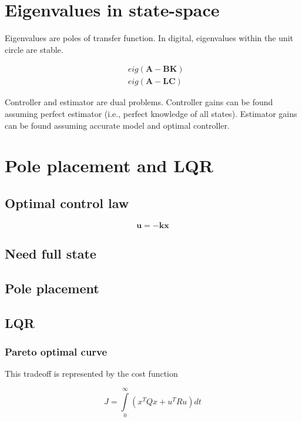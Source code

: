 \documentclass[10pt,conference,compsoc]{IEEEtran}
\newcommand{\mtx}[1] {\bm #1}
\begin{document}
\section{Eigenvalues in state-space}

\noindent Eigenvalues are poles of transfer function. In digital, eigenvalues
within the unit circle are stable.

\begin{align}
  &eig(\mtx{A} - \mtx{B}\mtx{K}) \\
  &eig(\mtx{A} - \mtx{L}\mtx{C})
\end{align}

\noindent Controller and estimator are dual problems. Controller gains can be
found assuming perfect estimator (i.e., perfect knowledge of all states).
Estimator gains can be found assuming accurate model and optimal controller.

\section{Pole placement and LQR}

\subsection{Optimal control law}

\begin{equation}
  \mtx{u} = -\mtx{k}\mtx{x}
\end{equation}

\subsection{Need full state}

\subsection{Pole placement}

\subsection{LQR}

\subsubsection{Pareto optimal curve}

This tradeoff is represented by the cost function

\begin{equation*}
  J = \int\limits_0^\infty \left(x^T Q x + u^T R u \right) dt
\end{equation*}
\end{document}
